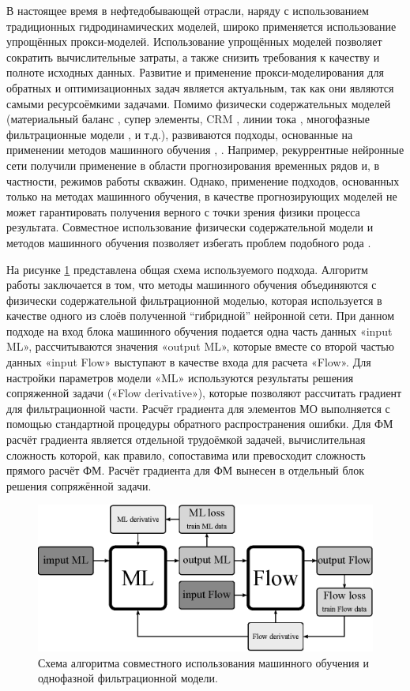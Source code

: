 \documentclass{article}
\begin{document}
В настоящее время в нефтедобывающей отрасли, наряду с использованием традиционных гидродинамических моделей, широко применяется использование упрощённых прокси-моделей. Использование упрощённых моделей позволяет сократить вычислительные затраты, а также снизить требования к качеству и полноте исходных данных. Развитие и применение прокси-моделирования для обратных и оптимизационных задач является актуальным, так как они являются самыми ресурсоёмкими задачами. Помимо физически содержательных моделей (материальный баланс \cite{mus1}, супер элементы, CRM \cite{bek}, линии тока \cite{pot}, многофазные фильтрационные модели \cite{ele}, \cite{kos} и т.д.), развиваются подходы, основанные на применении методов машинного обучения \cite{tem}, \cite{uma}. Например, рекуррентные нейронные сети получили применение в области прогнозирования временных рядов и, в частности, режимов работы скважин. Однако, применение подходов, основанных только на методах машинного обучения, в качестве прогнозирующих моделей не может гарантировать получения верного с точки зрения физики процесса результата. Совместное использование физически содержательной модели и методов машинного обучения позволяет избегать проблем подобного рода \cite{kos2}.

На рисунке \ref{fig:schime1} представлена общая схема используемого подхода. Алгоритм работы заключается в том, что методы машинного обучения объединяются с физически содержательной фильтрационной моделью, которая используется в качестве одного из слоёв полученной “гибридной” нейронной сети. При данном подходе на вход блока машинного обучения подается одна часть данных «input ML», рассчитываются значения «output ML», которые вместе со второй частью данных «input Flow» выступают в качестве входа для расчета «Flow». Для настройки параметров модели «ML» используются результаты решения сопряженной задачи («Flow derivative»), которые позволяют рассчитать градиент для фильтрационной части. Расчёт градиента для элементов МО выполняется с помощью стандартной процедуры обратного распространения ошибки. Для ФМ расчёт градиента является отдельной трудоёмкой задачей, вычислительная сложность которой, как правило, сопоставима или превосходит сложность прямого расчёт ФМ. Расчёт градиента для ФМ вынесен в отдельный блок решения сопряжённой задачи.

\begin{figure}
	\centering
	\includegraphics[width=0.7\linewidth]{images/fig1.eps}
	\caption{Схема алгоритма совместного использования машинного обучения и однофазной фильтрационной модели.}
	\label{fig:schime1}
\end{figure}
\end{document}
